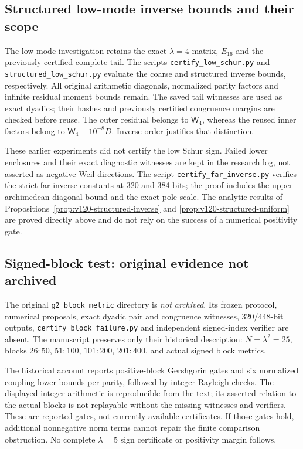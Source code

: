 \documentclass[11pt]{article}
\theoremstyle{remark}
\begin{document}
\subsection*{Structured low-mode inverse bounds and their scope}
The low-mode investigation retains the exact $\lambda=4$ matrix,
$E_{16}$ and the previously certified complete tail. The scripts
\texttt{certify\_low\_schur.py} and
\texttt{structured\_low\_schur.py} evaluate the coarse and structured
inverse bounds, respectively. All original arithmetic diagonals,
normalized parity factors and infinite residual moment bounds remain.
The saved tail witnesses are used as exact dyadics; their hashes and
previously certified congruence margins are checked before reuse.
The outer residual belongs to $\mathsf W_4$, whereas the reused inner
factors belong to $\mathsf W_4-10^{-8}D$. Inverse order justifies
that distinction.

These earlier experiments did not certify the low Schur sign. Failed
lower enclosures and their exact diagnostic witnesses are kept in the
research log, not asserted as negative Weil directions. The script \texttt{certify\_far\_inverse.py} verifies the
strict far-inverse constants at 320 and 384 bits; the proof includes
the upper archimedean diagonal bound and the exact pole scale.
The analytic
results of Propositions~\ref{prop:v120-structured-inverse} and
\ref{prop:v120-structured-uniform} are proved directly above and
do not rely on the success of a numerical positivity gate.



\subsection*{Signed-block test: original evidence not archived}
\label{app:v128-test}
The original \texttt{g2\_block\_metric} directory is \emph{not archived}.
Its frozen protocol, numerical proposals, exact dyadic pair and congruence
witnesses, $320/448$-bit outputs, \nolinkurl{certify_block_failure.py}
and independent signed-index verifier are absent. The manuscript preserves
only their historical description: $N=\lambda^2=25$, blocks $26{:}50$,
$51{:}100$, $101{:}200$, $201{:}400$, and actual signed block metrics.

The historical account reports positive-block Gershgorin gates and six
normalized coupling lower bounds per parity, followed by integer
Rayleigh checks. The displayed integer arithmetic is reproducible from
the text; its asserted relation to the actual blocks is not replayable
without the missing witnesses and verifiers. These are reported gates,
not currently available certificates. If those gates hold, additional
nonnegative norm terms cannot repair the finite comparison obstruction.
No complete $\lambda=5$ sign certificate or positivity margin follows.
\end{document}
